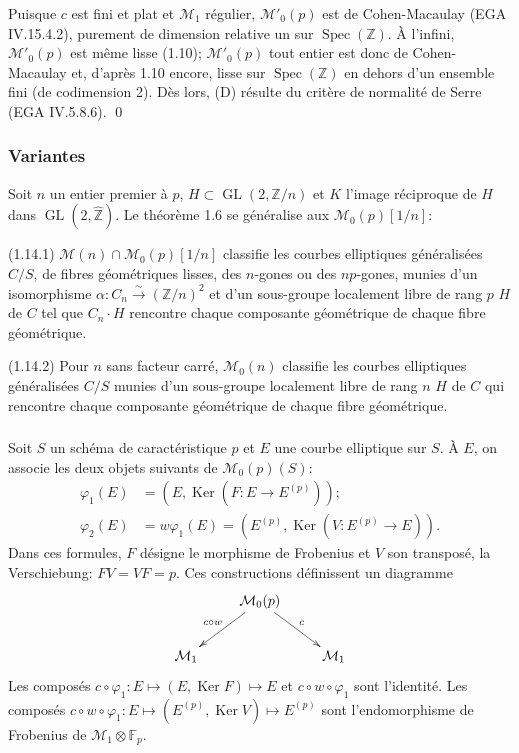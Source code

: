 \documentclass[11pt,a4paper]{amsart}
\theoremstyle{plain}
\theoremstyle{definition}
\DeclareMathOperator{\Spec}{Spec}
\DeclareMathOperator{\Ker}{Ker}
\DeclareMathOperator{\Gl}{GL}
\newcommand{\mll}{\mathcal{M}}
\newcommand{\ZZ}{\mathbb{Z}}
\newcommand{\FF}{\mathbb{F}}
\begin{document}
Puisque $c$ est fini et plat et $\mll_1$ r\'egulier, $\mll'_0(p)$ est de Cohen-Macaulay (EGA IV.15.4.2), purement de dimension relative un sur $\Spec(\ZZ)$. \`A l'infini, $\mll'_0(p)$ est m\^eme lisse (1.10); $\mll'_0(p)$ tout entier est donc de Cohen-Macaulay et, d'apr\`es 1.10 encore, lisse sur $\Spec(\ZZ)$ en dehors d'un ensemble fini (de codimension 2). D\`es lors, (D) r\'esulte du crit\`ere de normalit\'e de Serre (EGA IV.5.8.6).
\qed

\subsubsection{Variantes}
Soit $n$ un entier premier \`a $p$, $H \subset \Gl(2, \ZZ/n)$ et $K$ l'image r\'eciproque de $H$ dans $\Gl(2, \hat{\ZZ})$. Le th\'eor\`eme 1.6 se g\'en\'eralise aux $\mll_0(p)[1/n]$:

(1.14.1) $\mll(n) \cap \mll_0(p)[1/n]$ classifie les courbes elliptiques g\'en\'eralis\'ees $C/S$, de fibres g\'eom\'etriques lisses, des $n$-gones ou des $np$-gones, munies d'un isomorphisme $\alpha \colon C_n \xrightarrow{\sim} (\ZZ/n)^2$ et d'un sous-groupe localement libre de rang $p$ $H$ de $C$ tel que $C_n \cdot H$ rencontre chaque composante g\'eom\'etrique de chaque fibre g\'eom\'etrique.

(1.14.2) Pour $n$ sans facteur carr\'e, $\mll_0(n)$ classifie les courbes elliptiques g\'en\'eralis\'ees $C/S$ munies d'un sous-groupe localement libre de rang $n$ $H$ de $C$ qui rencontre chaque composante g\'eom\'etrique de chaque fibre g\'eom\'etrique.

\subsubsection{}
Soit $S$ un sch\'ema de caract\'eristique $p$ et $E$ une courbe elliptique sur $S$. \`A $E$, on associe les deux objets suivants de $\mll_0(p)(S)$:
\begin{align*}
\varphi_1(E) &= (E, \Ker(F \colon E \to E^{(p)})); \\
\varphi_2(E) &= w\varphi_1(E) = (E^{(p)}, \Ker(V \colon E^{(p)} \to E)).
\end{align*}
Dans ces formules, $F$ d\'esigne le morphisme de Frobenius et $V$ son transpos\'e, la Verschiebung: $FV = VF = p$. Ces constructions d\'efinissent un diagramme
\[
\xymatrix{
& \mll_0(p) \ar[dr]^{c} \ar[dl]_{c \circ w} \\
\mll_1 & & \mll_1
}
\]
Les compos\'es $c \circ \varphi_1 \colon E \mapsto (E, \Ker F) \mapsto E$ et $c \circ w \circ \varphi_1$ sont l'identit\'e. Les compos\'es $c \circ w \circ \varphi_1 \colon E \mapsto (E^{(p)}, \Ker V) \mapsto E^{(p)}$ sont l'endomorphisme de Frobenius de $\mll_1 \otimes \FF_p$.
\end{document}
